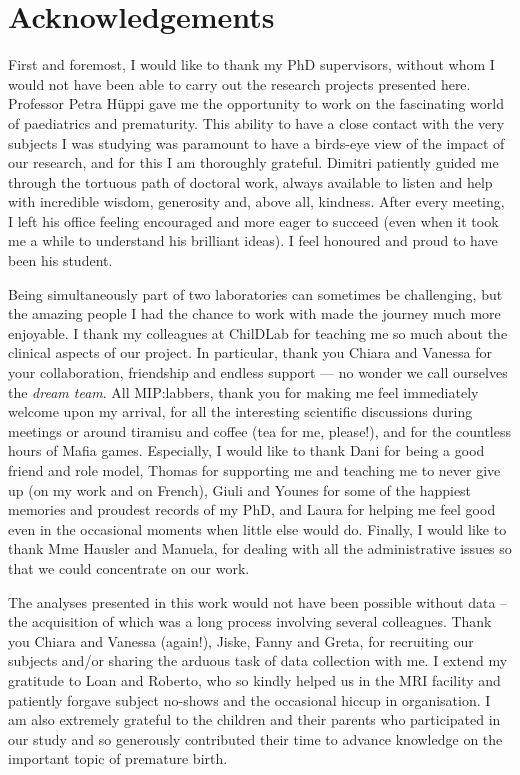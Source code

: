 \chapter*{Acknowledgements}
\lipsum[1-2]

\bigskip

First and foremost, I would like to thank my PhD supervisors, without whom I would not have been able to carry out the research projects presented here. Professor Petra Hüppi gave me the opportunity to work on the fascinating world of paediatrics and prematurity. This ability to have a close contact with the very subjects I was studying was paramount to have a birds-eye view of the impact of our research, and for this I am thoroughly grateful. Dimitri patiently guided me through the tortuous path of doctoral work, always available to listen and help with incredible wisdom, generosity and, above all, kindness. After every meeting, I left his office feeling encouraged and more eager to succeed (even when it took me a while to understand his brilliant ideas). I feel honoured and proud to have been his student.   

Being simultaneously part of two laboratories can sometimes be challenging, but the amazing people I had the chance to work with made the journey much more enjoyable. I thank my colleagues at ChilDLab for teaching me so much about the clinical aspects of our project. In particular, thank you Chiara and Vanessa for your collaboration, friendship and endless support --- no wonder we call ourselves the \textit{dream team}. All MIP:labbers, thank you for making me feel immediately welcome upon my arrival, for all the interesting scientific discussions during meetings or around tiramisu and coffee (tea for me, please!), and for the countless hours of Mafia games. Especially, I would like to thank Dani for being a good friend and role model, Thomas for supporting me and teaching me to never give up (on my work and on French), Giuli and Younes for some of the happiest memories and proudest records of my PhD, and Laura for helping me feel good even in the occasional moments when little else would do.  Finally, I would like to thank Mme Hausler and Manuela, for dealing with all the administrative issues so that we could concentrate on our work.

The analyses presented in this work would not have been possible without data – the acquisition of which was a long process involving several colleagues. Thank you Chiara and Vanessa (again!), Jiske, Fanny and Greta, for recruiting our subjects and/or sharing the arduous task of data collection with me. I extend my gratitude to Loan and Roberto, who so kindly helped us in the MRI facility and patiently forgave subject no-shows and the occasional hiccup in organisation. I am also extremely grateful to the children and their parents who participated in our study and so generously contributed their time to advance knowledge on the important topic of premature birth.

